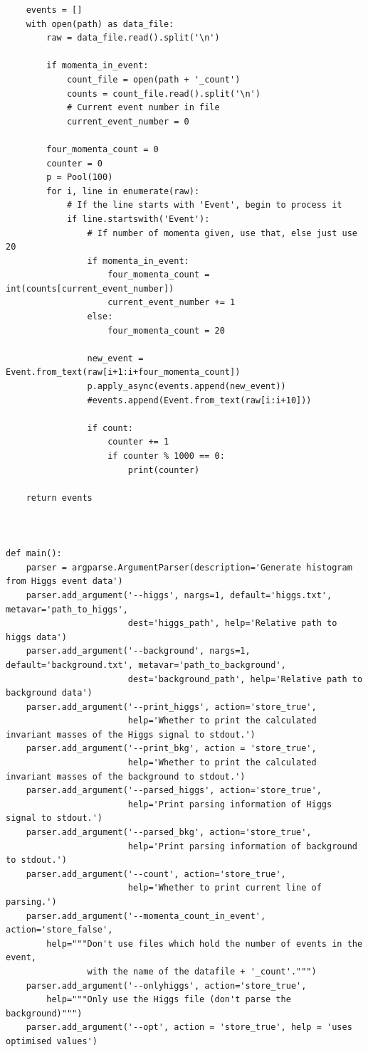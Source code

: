 \documentclass{article}
\begin{document}
\begin{lstlisting}
    events = []
    with open(path) as data_file:
        raw = data_file.read().split('\n')

        if momenta_in_event:
            count_file = open(path + '_count')
            counts = count_file.read().split('\n')
            # Current event number in file
            current_event_number = 0

        four_momenta_count = 0
        counter = 0
        p = Pool(100)
        for i, line in enumerate(raw):
            # If the line starts with 'Event', begin to process it
            if line.startswith('Event'):
                # If number of momenta given, use that, else just use 20
                if momenta_in_event:
                    four_momenta_count = int(counts[current_event_number])
                    current_event_number += 1
                else:
                    four_momenta_count = 20

                new_event = Event.from_text(raw[i+1:i+four_momenta_count])
                p.apply_async(events.append(new_event))
                #events.append(Event.from_text(raw[i:i+10]))

                if count:
                    counter += 1
                    if counter % 1000 == 0:
                        print(counter)

    return events



def main():
    parser = argparse.ArgumentParser(description='Generate histogram from Higgs event data')
    parser.add_argument('--higgs', nargs=1, default='higgs.txt', metavar='path_to_higgs',
                        dest='higgs_path', help='Relative path to higgs data')
    parser.add_argument('--background', nargs=1, default='background.txt', metavar='path_to_background',
                        dest='background_path', help='Relative path to background data')
    parser.add_argument('--print_higgs', action='store_true',
                        help='Whether to print the calculated invariant masses of the Higgs signal to stdout.')
    parser.add_argument('--print_bkg', action = 'store_true',
                        help='Whether to print the calculated invariant masses of the background to stdout.')
    parser.add_argument('--parsed_higgs', action='store_true',
                        help='Print parsing information of Higgs signal to stdout.')
    parser.add_argument('--parsed_bkg', action='store_true',
                        help='Print parsing information of background to stdout.')
    parser.add_argument('--count', action='store_true',
                        help='Whether to print current line of parsing.')
    parser.add_argument('--momenta_count_in_event', action='store_false',
        help="""Don't use files which hold the number of events in the event,
                with the name of the datafile + '_count'.""")
    parser.add_argument('--onlyhiggs', action='store_true',
        help="""Only use the Higgs file (don't parse the background)""")
    parser.add_argument('--opt', action = 'store_true', help = 'uses optimised values')


\end{lstlisting}
\end{document}
